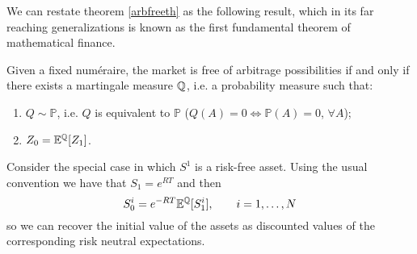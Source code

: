 We can restate theorem \ref{arbfreeth} as the following result, which in its far reaching generalizations is known as the first fundamental theorem of mathematical finance.
\begin{theorem} 
    Given a fixed numéraire, the market is free of arbitrage possibilities if and only if there exists a martingale measure ${\mathbb{Q}}$, i.e. a probability measure such that:
    \begin{enumerate}
        \item $Q\sim \mathbb{P}$, i.e. $Q$ is equivalent to $\mathbb{P}$ ($Q(A)=0\Leftrightarrow \mathbb{P}(A)=0$, $\forall A$);
        \item $Z_0 = \mathbb{E}^{\mathbb{Q}}[Z_1]$.
    \end{enumerate}
\end{theorem}
\begin{remark}
    Consider the special case in which $S^1$ is a risk-free asset. Using the usual convention we have that $S_1 = e^{RT}$ and then
    \begin{equation*}
        S_0^i = e^{-RT}\mathbb{E}^{\mathbb{Q}}[S_1^i], \qquad i = 1,\dots,N
    \end{equation*}
    so we can recover the initial value of the assets as discounted values of the corresponding risk neutral expectations.
\end{remark}

